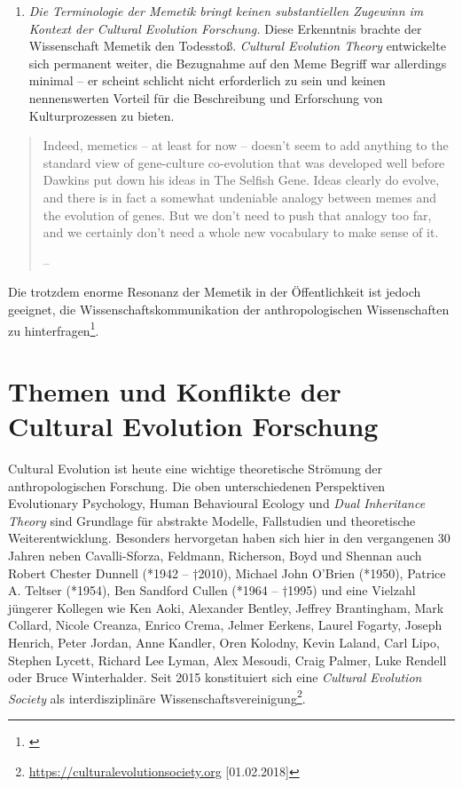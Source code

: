 \documentclass[openany,twoside,twocolumn]{book}
\providecommand{\tightlist}{%
  \setlength{\itemsep}{0pt}\setlength{\parskip}{0pt}}
\let\rmarkdownfootnote\footnote%
\def\footnote{\protect\rmarkdownfootnote}
\begin{document}
\begin{enumerate}
\def\labelenumi{\arabic{enumi}.}
\setcounter{enumi}{2}
\tightlist
\item
  \emph{Die Terminologie der Memetik bringt keinen substantiellen
  Zugewinn im Kontext der Cultural Evolution Forschung.} Diese
  Erkenntnis brachte der Wissenschaft Memetik den Todesstoß.
  \emph{Cultural Evolution Theory} entwickelte sich permanent weiter,
  die Bezugnahme auf den Meme Begriff war allerdings minimal -- er
  scheint schlicht nicht erforderlich zu sein und keinen nennenswerten
  Vorteil für die Beschreibung und Erforschung von Kulturprozessen zu
  bieten.
\end{enumerate}

\begin{quote}
Indeed, memetics -- at least for now -- doesn't seem to add anything to
the standard view of gene-culture co-evolution that was developed well
before Dawkins put down his ideas in The Selfish Gene. Ideas clearly do
evolve, and there is in fact a somewhat undeniable analogy between memes
and the evolution of genes. But we don't need to push that analogy too
far, and we certainly don't need a whole new vocabulary to make sense of
it.

-- \textcite{pigliucci_trouble_2007}
\end{quote}

Die trotzdem enorme Resonanz der Memetik in der Öffentlichkeit ist
jedoch geeignet, die Wissenschaftskommunikation der anthropologischen
Wissenschaften zu hinterfragen\footnote{\textcite{bloch_where_2005}}.

\hypertarget{themen-und-konflikte-der-cultural-evolution-forschung}{%
\section{Themen und Konflikte der Cultural Evolution
Forschung}\label{themen-und-konflikte-der-cultural-evolution-forschung}}

Cultural Evolution ist heute eine wichtige theoretische Strömung der
anthropologischen Forschung. Die oben unterschiedenen Perspektiven
Evolutionary Psychology, Human Behavioural Ecology und \emph{Dual
Inheritance Theory} sind Grundlage für abstrakte Modelle, Fallstudien
und theoretische Weiterentwicklung. Besonders hervorgetan haben sich
hier in den vergangenen 30 Jahren neben Cavalli-Sforza, Feldmann,
Richerson, Boyd und Shennan auch Robert Chester Dunnell (*1942 --
†2010), Michael John O'Brien (*1950), Patrice A. Teltser (*1954), Ben
Sandford Cullen (*1964 -- †1995) und eine Vielzahl jüngerer Kollegen wie
Ken Aoki, Alexander Bentley, Jeffrey Brantingham, Mark Collard, Nicole
Creanza, Enrico Crema, Jelmer Eerkens, Laurel Fogarty, Joseph Henrich,
Peter Jordan, Anne Kandler, Oren Kolodny, Kevin Laland, Carl Lipo,
Stephen Lycett, Richard Lee Lyman, Alex Mesoudi, Craig Palmer, Luke
Rendell oder Bruce Winterhalder. Seit 2015 konstituiert sich eine
\emph{Cultural Evolution Society} als interdisziplinäre
Wissenschaftsvereinigung\footnote{\url{https://culturalevolutionsociety.org}
  {[}01.02.2018{]}}.
\end{document}
